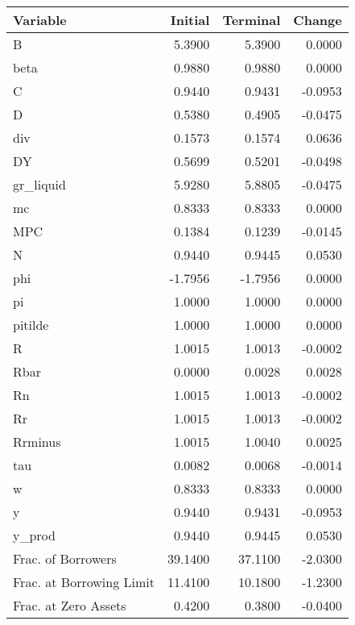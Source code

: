 \begin{table}
\centering
\label{tab:stst_comparison_end_L_wedge_permanent}
\begin{tabular}{lrrr}
\toprule
                Variable &  Initial &  Terminal &  Change \\
\midrule
                       B &   5.3900 &    5.3900 &  0.0000 \\
                    beta &   0.9880 &    0.9880 &  0.0000 \\
                       C &   0.9440 &    0.9431 & -0.0953 \\
                       D &   0.5380 &    0.4905 & -0.0475 \\
                     div &   0.1573 &    0.1574 &  0.0636 \\
                      DY &   0.5699 &    0.5201 & -0.0498 \\
               gr\_liquid &   5.9280 &    5.8805 & -0.0475 \\
                      mc &   0.8333 &    0.8333 &  0.0000 \\
                     MPC &   0.1384 &    0.1239 & -0.0145 \\
                       N &   0.9440 &    0.9445 &  0.0530 \\
                     phi &  -1.7956 &   -1.7956 &  0.0000 \\
                      pi &   1.0000 &    1.0000 &  0.0000 \\
                 pitilde &   1.0000 &    1.0000 &  0.0000 \\
                       R &   1.0015 &    1.0013 & -0.0002 \\
                    Rbar &   0.0000 &    0.0028 &  0.0028 \\
                      Rn &   1.0015 &    1.0013 & -0.0002 \\
                      Rr &   1.0015 &    1.0013 & -0.0002 \\
                 Rrminus &   1.0015 &    1.0040 &  0.0025 \\
                     tau &   0.0082 &    0.0068 & -0.0014 \\
                       w &   0.8333 &    0.8333 &  0.0000 \\
                       y &   0.9440 &    0.9431 & -0.0953 \\
                  y\_prod &   0.9440 &    0.9445 &  0.0530 \\
      Frac. of Borrowers &  39.1400 &   37.1100 & -2.0300 \\
Frac. at Borrowing Limit &  11.4100 &   10.1800 & -1.2300 \\
    Frac. at Zero Assets &   0.4200 &    0.3800 & -0.0400 \\
\bottomrule
\end{tabular}
\end{table}
